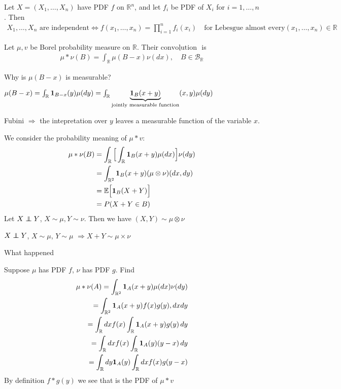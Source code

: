 \documentclass[11pt]{article}
\begin{document}
\begin{corollary}
    Let $X = (X_1, \ldots ,X_n)$ have PDF $f$ on $\mathbb{R}^{n}$, and let $f_i$ be PDF of
    $X_{i}$ for $i=1, \ldots ,n$. Then
    \begin{align*}
        X_1, \ldots ,X_{n} \text{ are independent} \iff f(x_1, \ldots ,x_n) = \prod_{i=1}^{n}f_i(x_i)
        \quad \text{for Lebesgue almost every} (x_1, \ldots ,x_n) \in \mathbb{R} 
    \end{align*}
\end{corollary}

\begin{definition}[convolutions]
    Let $\mu, v$ be Borel probability measure on $\mathbb{R}$. Their $\underline{\text{
        convolution
    }}$ is 
    \begin{align*}
        \mu * \nu(B) = \int_{\mathbb{R}} \mu(B-x)\nu(dx), \quad B \in \mathcal{B}_{\mathbb{R}}
    \end{align*}
\end{definition}

Why is $\mu(B-x)$ is measurable?

$\mu(B-x) = \int_{\mathbb{R}}\1_{B-x}(y)\mu(dy) = \int_{\mathbb{R}}
\underbrace{\1_{B}(x+y)}_\text{jointly measurable function}(x,y)\mu(dy)$

Fubini $\Longrightarrow$ the intepretation over $y$ leaves a measurable function of the variable $x$.

\vspace{10mm}
We consider the probability meaning of $\mu*v$:
\begin{align*}
    \mu * \nu(B) &= \int_{\mathbb{R}}\Big[\int_{\mathbb{R}}\bm{1}_{B}(x+y)\mu(dx) \Big]\nu(dy)\\
    &= \int_{\mathbb{R}^{2}}\bm{1}_{B}(x+y)(\mu \otimes \nu)(dx,dy)\\
    &= \mathbb{E}\Big[\bm{1}_{B}(X+Y)\Big]\\
    &= P(X+Y \in B)
\end{align*}
Let $X \independent Y$, $X \sim  \mu, Y \sim  \nu$. Then we have $(X,Y) \sim  \mu\otimes \nu$

\begin{theorem}
    $X \independent Y$, $X \sim  \mu$, $Y \sim \mu $ $\Longrightarrow X+Y \sim  \mu\times \nu$
\end{theorem}

What happened 

Suppose $\mu$ has PDF $f$, $\nu$ has PDF $g$. Find 
\begin{align*}
    \mu * \nu(A) = \int_{\mathbb{R}^{2}}\bm{1}_{A}(x+y)\mu(dx)\nu(dy)\\
    = \int_{\mathbb{R}^{2}}\bm{1}_{A}(x+y)f(x)g(y), dxdy\\
    = \int_{\mathbb{R}}dxf(x) \int_{\mathbb{R}}\bm{1}_{A}(x+y)g(y)\, dy\\
    = \int_{\mathbb{R}}dxf(x) \int_{\mathbb{R}}\bm{1}_{A}(y)(y-x)\,dy\\
    = \int_{\mathbb{R}}dy\bm{1}_{A}(y) \int_{\mathbb{R}}dx f(x)g(y-x)
\end{align*}
By definition $f*g(y)$ we see that is the PDF of $\mu * v$
\end{document}
